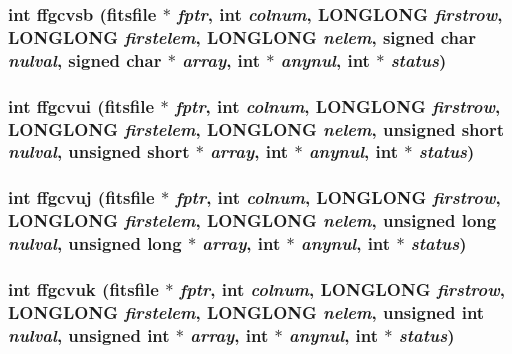 \subsubsection{\setlength{\rightskip}{0pt plus 5cm}int ffgcvsb (\bf{fitsfile} $\ast$ {\em fptr}, int {\em colnum}, \bf{LONGLONG} {\em firstrow}, \bf{LONGLONG} {\em firstelem}, \bf{LONGLONG} {\em nelem}, signed char {\em nulval}, signed char $\ast$ {\em array}, int $\ast$ {\em anynul}, int $\ast$ {\em status})}\label{fitsio__64_8h_06cbefc9f11f58661a66f4ed52b05d11}


\subsubsection{\setlength{\rightskip}{0pt plus 5cm}int ffgcvui (\bf{fitsfile} $\ast$ {\em fptr}, int {\em colnum}, \bf{LONGLONG} {\em firstrow}, \bf{LONGLONG} {\em firstelem}, \bf{LONGLONG} {\em nelem}, unsigned short {\em nulval}, unsigned short $\ast$ {\em array}, int $\ast$ {\em anynul}, int $\ast$ {\em status})}\label{fitsio__64_8h_4370d87e5941c7d816961ca76b625dfc}


\subsubsection{\setlength{\rightskip}{0pt plus 5cm}int ffgcvuj (\bf{fitsfile} $\ast$ {\em fptr}, int {\em colnum}, \bf{LONGLONG} {\em firstrow}, \bf{LONGLONG} {\em firstelem}, \bf{LONGLONG} {\em nelem}, unsigned long {\em nulval}, unsigned long $\ast$ {\em array}, int $\ast$ {\em anynul}, int $\ast$ {\em status})}\label{fitsio__64_8h_0016dfa0f5bcc9c887e899ed6d4562a4}


\subsubsection{\setlength{\rightskip}{0pt plus 5cm}int ffgcvuk (\bf{fitsfile} $\ast$ {\em fptr}, int {\em colnum}, \bf{LONGLONG} {\em firstrow}, \bf{LONGLONG} {\em firstelem}, \bf{LONGLONG} {\em nelem}, unsigned int {\em nulval}, unsigned int $\ast$ {\em array}, int $\ast$ {\em anynul}, int $\ast$ {\em status})}\label{fitsio__64_8h_39e9176ab61410b852bcce4e4e7d4fae}


